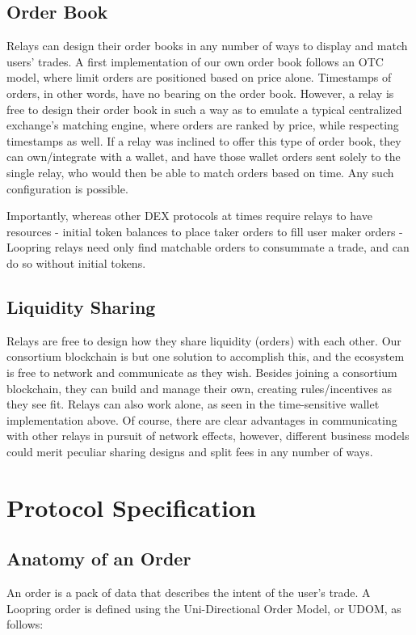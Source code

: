 \documentclass[UTF8,nofonts]{article}
\begin{document}
\begin{multicols}{2}
\subsection{Order Book\label{sec:order_book}}
Relays can design their order books in any number of ways to display and match users' trades. A first implementation of our own order book follows an OTC model, where limit orders are positioned based on price alone. Timestamps of orders, in other words, have no bearing on the order book. However, a relay is free to design their order book in such a way as to emulate a typical centralized exchange's matching engine, where orders are ranked by price, while respecting timestamps as well. If a relay was inclined to offer this type of order book, they can own/integrate with a wallet, and have those wallet orders sent solely to the single relay, who would then be able to match orders based on time. Any such configuration is possible.

Importantly, whereas other DEX protocols at times require relays to have resources - initial token balances to place taker orders to fill user maker orders - Loopring relays need only find matchable orders to consummate a trade, and can do so without initial tokens.

\subsection{Liquidity Sharing\label{sec:liquidity_sharing}}
Relays are free to design how they share liquidity (orders) with each other. Our consortium blockchain is but one solution to accomplish this, and the ecosystem is free to network and communicate as they wish. Besides joining a consortium blockchain, they can build and manage their own, creating rules/incentives as they see fit. Relays can also work alone, as seen in the time-sensitive wallet implementation above. Of course, there are clear advantages in communicating with other relays in pursuit of network effects, however, different business models could merit peculiar sharing designs and split fees in any number of ways.


\section{Protocol Specification\label{sec:protocol}}

\subsection{Anatomy of an Order\label{anatomy}}
An order is a pack of data that describes the intent of the user's trade. A Loopring order is defined using the Uni-Directional Order Model, or UDOM, as follows:


\end{multicols}
\end{document}
